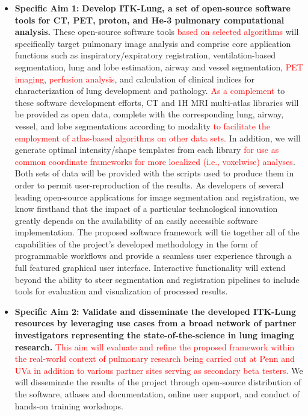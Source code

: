 \documentclass[11pt,]{article}
\providecommand{\tightlist}{%
  \setlength{\itemsep}{0pt}\setlength{\parskip}{0pt}}
\begin{document}
\begin{itemize}
\tightlist
\item
  \textbf{Specific Aim 1:} \textbf{Develop ITK-Lung, a set of
  open-source software tools for CT, PET, proton, and He-3 pulmonary
  computational analysis.} These open-source software tools
  \textcolor{red}{based on selected algorithms} will specifically target
  pulmonary image analysis and comprise core application functions such
  as inspiratory/expiratory registration, ventilation-based
  segmentation, lung and lobe estimation, airway and vessel
  segmentation, \textcolor{red}{PET imaging},
  \textcolor{red}{perfusion analysis}, and calculation of clinical
  indices for characterization of lung development and pathology.
  \textcolor{red}{As a complement} to these software development
  efforts, CT and 1H MRI multi-atlas libraries will be provided as open
  data, complete with the corresponding lung, airway, vessel, and lobe
  segmentations according to modality
  \textcolor{red}{to facilitate the employment of atlas-based algorithms on other data sets.}
  In addition, we will generate optimal intensity/shape templates from
  each library \textcolor{red}{for use as common
  coordinate frameworks for more localized (i.e., voxelwise) analyses}.
  Both sets of data will be provided with the scripts used to produce
  them in order to permit user-reproduction of the results. As
  developers of several leading open-source applications for image
  segmentation and registration, we know firsthand that the impact of a
  particular technological innovation greatly depends on the
  availability of an easily accessible software implementation. The
  proposed software framework will tie together all of the capabilities
  of the project's developed methodology in the form of programmable
  workflows and provide a seamless user experience through a full
  featured graphical user interface. Interactive functionality will
  extend beyond the ability to steer segmentation and registration
  pipelines to include tools for evaluation and visualization of
  processed results.
\item
  \textbf{Specific Aim 2:} \textbf{Validate and disseminate the
  developed ITK-Lung resources by leveraging use cases from a broad
  network of partner investigators representing the state-of-the-science
  in lung imaging research.}
  \textcolor{red}{This aim will evaluate and refine the proposed framework within the real-world context of pulmonary research being carried out at Penn and UVa in addition to various partner sites serving as secondary beta testers.}
  We will disseminate the results of the project through open-source
  distribution of the software, atlases and documentation, online user
  support, and conduct of hands-on training workshops.
\end{itemize}
\end{document}
